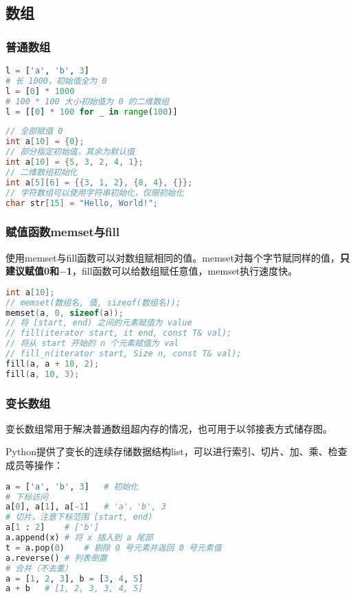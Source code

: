 \subsection{数组}

\subsubsection{普通数组}

\begin{lstlisting}[language=python]
l = ['a', 'b', 3]
# 长 1000，初始值全为 0
l = [0] * 1000
# 100 * 100 大小初始值为 0 的二维数组
l = [[0] * 100 for _ in range(100)]
\end{lstlisting}

\begin{lstlisting}[language=c++]
// 全部赋值 0
int a[10] = {0};
// 部分指定初始值，其余为默认值
int a[10] = {5, 3, 2, 4, 1};
// 二维数组初始化
int a[5][6] = {{3, 1, 2}, {8, 4}, {}};
// 字符数组可以使用字符串初始化，仅限初始化
char str[15] = "Hello, World!";
\end{lstlisting}

\subsubsection{赋值函数memset与fill}

使用memset与fill函数可以对数组赋相同的值。memset对每个字节赋同样的值，\textbf{只建议赋值0和$-$1}，fill函数可以给数组赋任意值，memset执行速度快。

\begin{lstlisting}[language=c++]
int a[10];
// memset(数组名, 值, sizeof(数组名));
memset(a, 0, sizeof(a));
// 将 [start, end) 之间的元素赋值为 value
// fill(iterator start, it end, const T& val);
// 将从 start 开始的 n 个元素赋值为 val
// fill_n(iterator start, Size n, const T& val);
fill(a, a + 10, 2);
fill(a, 10, 3);
\end{lstlisting}

\subsubsection{变长数组}

变长数组常用于解决普通数组超内存的情况，也可用于以邻接表方式储存图。

Python提供了变长的连续存储数据结构list，可以进行索引、切片、加、乘、检查成员等操作：

\begin{lstlisting}[language=python]
a = ['a', 'b', 3]	# 初始化
# 下标访问
a[0], a[1], a[-1]	# 'a'，'b', 3
# 切片，注意下标范围 [start, end)
a[1 : 2]	# ['b']
a.append(x)	# 将 x 插入到 a 尾部
t = a.pop(0)	# 剔除 0 号元素并返回 0 号元素值
a.reverse()	# 列表倒置
# 合并（不去重）
a = [1, 2, 3], b = [3, 4, 5]
a + b	# [1, 2, 3, 3, 4, 5]
\end{lstlisting}

